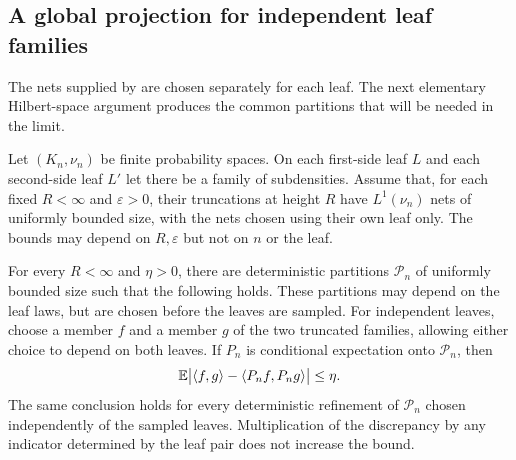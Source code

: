 \subsection{A global projection for independent leaf families}

The nets supplied by  are chosen separately
for each leaf. The next elementary Hilbert-space argument produces the
common partitions that will be needed in the limit.

\begin{lemma}
\label{lem:limit-global-projection}
Let $(K_n,\nu_n)$ be finite probability spaces. On each first-side leaf
$L$ and each second-side leaf $L'$ let there be a family of subdensities.
Assume that, for each fixed $R<\infty$ and $\varepsilon>0$, their
truncations at height $R$ have $L^1(\nu_n)$ nets of uniformly bounded
size, with the nets chosen using their own leaf only. The bounds may
depend on $R,\varepsilon$ but not on $n$ or the leaf.

For every $R<\infty$ and $\eta>0$, there are deterministic partitions
$\mathcal P_n$ of uniformly bounded size such that the following holds.
These partitions may depend on the leaf laws, but are chosen before
the leaves are sampled.
For independent leaves, choose a member $f$ and a member $g$ of the two
truncated families, allowing either choice to depend on both leaves.
If $P_n$ is conditional expectation onto $\mathcal P_n$, then
\begin{equation}
\label{eq:limit-projection-error}
\mathbb E\bigl|\langle f,g\rangle-\langle P_nf,P_ng\rangle\bigr|\le\eta.
\end{equation}
The same conclusion holds for every deterministic refinement of
$\mathcal P_n$ chosen independently of the sampled leaves.
Multiplication of the discrepancy by any indicator determined by the
leaf pair does not increase the bound.
\end{lemma}

